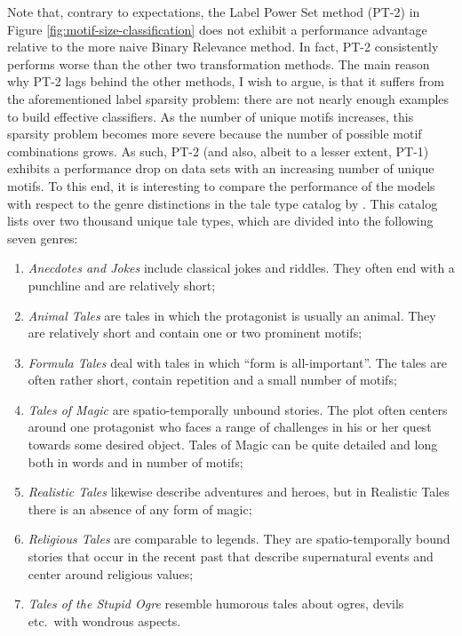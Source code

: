 Note that, contrary to expectations, the Label Power Set method (PT-2) in Figure \ref{fig:motif-size-classification} does not exhibit a performance advantage relative to the more naive Binary Relevance method. In fact, PT-2 consistently performs worse than the other two transformation methods. The main reason why PT-2 lags behind the other methods, I wish to argue, is that it suffers from the aforementioned label sparsity problem: there are not nearly enough examples to build effective classifiers. As the number of unique motifs increases, this sparsity problem becomes more severe because the number of possible motif combinations grows. As such, PT-2 (and also, albeit to a lesser extent, PT-1) exhibits a performance drop on data sets with an increasing number of unique motifs. To this end, it is interesting to compare the performance of the models with respect to the genre distinctions in the tale type catalog by \citeauthor{uther:2004}. This catalog lists over two thousand unique tale types, which are divided into the following seven genres:

\begin{enumerate}
    \item \emph{Anecdotes and Jokes} include classical jokes and riddles. They often end with a punchline and are relatively short;
    \item \emph{Animal Tales} are tales in which the protagonist is usually an animal. They are relatively short and contain one or two prominent motifs;
    \item \emph{Formula Tales} deal with tales in which ``form is all-important''\autocite[229]{thompson:1977}. The tales are often rather short, contain repetition and a small number of motifs;
     \item \emph{Tales of Magic} are spatio-temporally unbound stories. The plot often centers around one protagonist who faces a range of challenges in his or her quest towards some desired object. Tales of Magic can be quite detailed and long both in words and in number of motifs;
    \item  \emph{Realistic Tales} likewise describe adventures and heroes, but in Realistic Tales there is an absence of any form of magic;
    \item \emph{Religious Tales} are comparable to legends. They are spatio-temporally bound stories that occur in the recent past that describe supernatural events and center around religious values;
    \item \emph{Tales of the Stupid Ogre} resemble humorous tales about ogres, devils etc.\ with wondrous aspects.
\end{enumerate}

